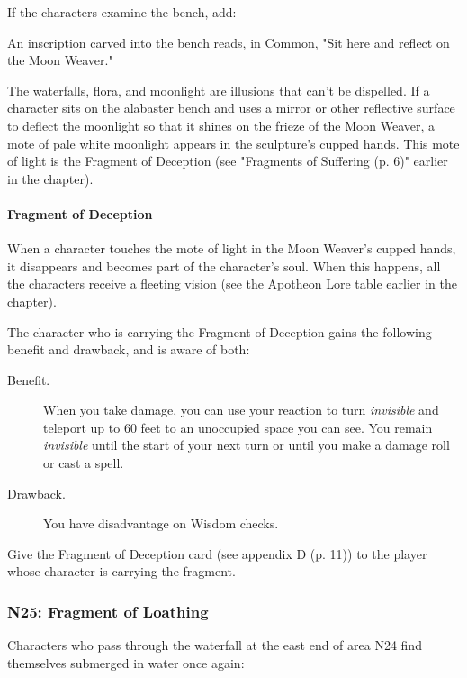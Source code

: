 \documentclass[a4paper, 11pt, bg=full, twocolumn, nooutline]{dndbook}
\begin{document}
If the characters examine the bench, add:

\begin{DndReadAloud}
An inscription carved into the bench reads, in Common, "Sit here and reflect on the Moon Weaver."
\end{DndReadAloud}

The waterfalls, flora, and moonlight are illusions that can't be dispelled. If a character sits on the alabaster bench and uses a mirror or other reflective surface to deflect the moonlight so that it shines on the frieze of the Moon Weaver, a mote of pale white moonlight appears in the sculpture's cupped hands. This mote of light is the Fragment of Deception (see "Fragments of Suffering (p. 6)" earlier in the chapter).

\paragraph{Fragment of Deception}

When a character touches the mote of light in the Moon Weaver's cupped hands, it disappears and becomes part of the character's soul. When this happens, all the characters receive a fleeting vision (see the Apotheon Lore table earlier in the chapter).

The character who is carrying the Fragment of Deception gains the following benefit and drawback, and is aware of both:

\begin{DndSidebar}{}
\begin{description}
\item[Benefit.] When you take damage, you can use your reaction to turn \textit{invisible} and teleport up to 60 feet to an unoccupied space you can see. You remain \textit{invisible} until the start of your next turn or until you make a damage roll or cast a spell.
\item[Drawback.] You have disadvantage on Wisdom checks.
\end{description}
\end{DndSidebar}

Give the Fragment of Deception card (see appendix D (p. 11)) to the player whose character is carrying the fragment.

\subsubsection{N25: Fragment of Loathing}

Characters who pass through the waterfall at the east end of area N24 find themselves submerged in water once again:
\end{document}
